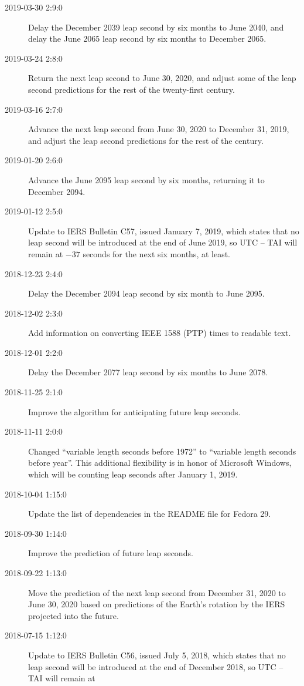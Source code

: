 \documentclass[letterpaper,twoside]{article}
\begin{document}
\begin{description}
\item[2019-03-30 2:9:0] Delay the December 2039 leap second by six
  months to June 2040, and delay the June 2065 leap second by six
  months to December 2065.
\item[2019-03-24 2:8:0] Return the next leap second to June 30, 2020,
  and adjust some of the leap second predictions for the rest of the
  twenty-first century.
\item[2019-03-16 2:7:0] Advance the next leap second from June 30, 2020
  to December 31, 2019, and adjust the leap second predictions
  for the rest of the century.
\item[2019-01-20 2:6:0] Advance the June 2095 leap second by six
  months, returning it to December 2094.
\item[2019-01-12 2:5:0] Update to IERS Bulletin C57, issued January
  7, 2019, which states that no leap second will be introduced
  at the end of June 2019, so UTC -- TAI will remain at
  $-37$ seconds for the next six months, at least.  
\item[2018-12-23 2:4:0] Delay the December 2094 leap second by six month
  to June 2095.
\item[2018-12-02 2:3:0] Add information on converting IEEE 1588 (PTP)
  times to readable text.
\item[2018-12-01 2:2:0] Delay the December 2077 leap second by
  six months to June 2078.
\item[2018-11-25 2:1:0] Improve the algorithm for anticipating future
  leap seconds.
\item[2018-11-11 2:0:0] Changed ``variable length seconds before 1972''
  to ``variable length seconds before year''.  This additional flexibility
  is in honor of Microsoft Windows, which will be counting leap seconds
  after January 1, 2019.
\item[2018-10-04 1:15:0] Update the list of dependencies in the
  README file for Fedora 29.
\item[2018-09-30 1:14:0] Improve the prediction of future leap seconds.
\item[2018-09-22 1:13:0] Move the prediction of the next leap second
  from December 31, 2020 to June 30, 2020 based on predictions of
  the Earth's rotation by the IERS projected into the future.
\item[2018-07-15 1:12:0] Update to IERS Bulletin C56, issued July
  5, 2018, which states that no leap second will be introduced
  at the end of December 2018, so UTC -- TAI will remain at

\end{description}
\end{document}
